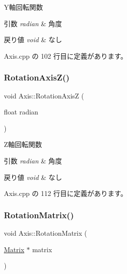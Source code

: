 Y軸回転関数 


\begin{DoxyParams}{引数}
{\em radian} & 角度 \\
\hline
\end{DoxyParams}

\begin{DoxyRetVals}{戻り値}
{\em void} & なし \\
\hline
\end{DoxyRetVals}


 Axis.\+cpp の 102 行目に定義があります。

\mbox{\label{class_axis_a1a0571e9a3e26843be14ff62f08351e3}} 
\subsubsection{\texorpdfstring{Rotation\+Axis\+Z()}{RotationAxisZ()}}
{\footnotesize\ttfamily void Axis\+::\+Rotation\+AxisZ (\begin{DoxyParamCaption}\item[{float}]{radian }\end{DoxyParamCaption})}



Z軸回転関数 


\begin{DoxyParams}{引数}
{\em radian} & 角度 \\
\hline
\end{DoxyParams}

\begin{DoxyRetVals}{戻り値}
{\em void} & なし \\
\hline
\end{DoxyRetVals}


 Axis.\+cpp の 112 行目に定義があります。

\mbox{\label{class_axis_a3fd6433b4949d4e826d51c1b3a812771}} 
\subsubsection{\texorpdfstring{Rotation\+Matrix()}{RotationMatrix()}}
{\footnotesize\ttfamily void Axis\+::\+Rotation\+Matrix (\begin{DoxyParamCaption}\item[{\mbox{\hyperlink{class_matrix}{Matrix}} $\ast$}]{matrix }\end{DoxyParamCaption})}




